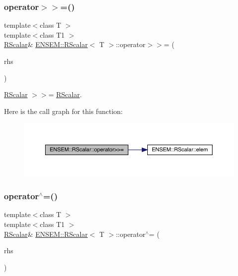 \subsubsection{\texorpdfstring{operator$>$$>$=()}{operator>>=()}\hspace{0.1cm}{\footnotesize\ttfamily [2/2]}}
{\footnotesize\ttfamily template$<$class T $>$ \\
template$<$class T1 $>$ \\
\mbox{\hyperlink{classENSEM_1_1RScalar}{R\+Scalar}}\& \mbox{\hyperlink{classENSEM_1_1RScalar}{E\+N\+S\+E\+M\+::\+R\+Scalar}}$<$ T $>$\+::operator$>$$>$= (\begin{DoxyParamCaption}\item[{const \mbox{\hyperlink{classENSEM_1_1RScalar}{R\+Scalar}}$<$ T1 $>$ \&}]{rhs }\end{DoxyParamCaption})\hspace{0.3cm}{\ttfamily [inline]}}



\mbox{\hyperlink{classENSEM_1_1RScalar}{R\+Scalar}} $>$$>$= \mbox{\hyperlink{classENSEM_1_1RScalar}{R\+Scalar}}. 

Here is the call graph for this function\+:
\nopagebreak
\begin{figure}[H]
\begin{center}
\leavevmode
\includegraphics[width=350pt]{d0/d8c/classENSEM_1_1RScalar_a35379cd7317c2c533aa26e3c15a9b03f_cgraph}
\end{center}
\end{figure}
\mbox{\label{classENSEM_1_1RScalar_ad69bdf7cec58f8ef8a8a42b250d97b25}} 
\subsubsection{\texorpdfstring{operator$^\wedge$=()}{operator^=()}\hspace{0.1cm}{\footnotesize\ttfamily [1/2]}}
{\footnotesize\ttfamily template$<$class T $>$ \\
template$<$class T1 $>$ \\
\mbox{\hyperlink{classENSEM_1_1RScalar}{R\+Scalar}}\& \mbox{\hyperlink{classENSEM_1_1RScalar}{E\+N\+S\+E\+M\+::\+R\+Scalar}}$<$ T $>$\+::operator$^\wedge$= (\begin{DoxyParamCaption}\item[{const \mbox{\hyperlink{classENSEM_1_1RScalar}{R\+Scalar}}$<$ T1 $>$ \&}]{rhs }\end{DoxyParamCaption})\hspace{0.3cm}{\ttfamily [inline]}}




